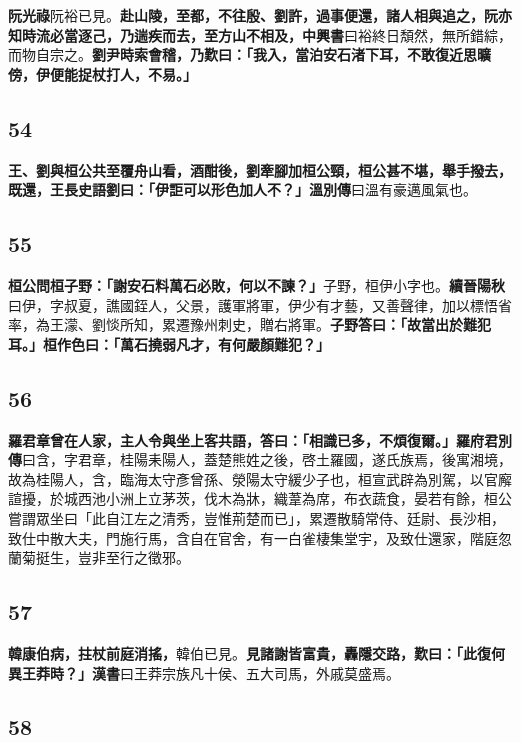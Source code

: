 \textbf{阮光祿}{\footnotesize 阮裕已見。}\textbf{赴山陵，至都，不往殷、劉許，過事便還，諸人相與追之，阮亦知時流必當逐己，乃遄疾而去，至方山不相及，}{\footnotesize \textbf{中興書}曰裕終日頽然，無所錯綜，而物自宗之。}\textbf{劉尹時索會稽，乃歎曰：「我入，當泊安石渚下耳，不敢復近思曠傍，伊便能捉杖打人，不易。」}

\subsection*{54}

\textbf{王、劉與桓公共至覆舟山看，酒酣後，劉牽腳加桓公頸，桓公甚不堪，舉手撥去，既還，王長史語劉曰：「伊詎可以形色加人不？」}{\footnotesize \textbf{溫別傳}曰溫有豪邁風氣也。}

\subsection*{55}

\textbf{桓公問桓子野：「謝安石料萬石必敗，何以不諫？」}{\footnotesize 子野，桓伊小字也。\textbf{續晉陽秋}曰伊，字叔夏，譙國銍人，父景，護軍將軍，伊少有才藝，又善聲律，加以標悟省率，為王濛、劉惔所知，累遷豫州刺史，贈右將軍。}\textbf{子野答曰：「故當出於難犯耳。」桓作色曰：「萬石撓弱凡才，有何嚴顏難犯？」}

\subsection*{56}

\textbf{羅君章曾在人家，主人令與坐上客共語，答曰：「相識已多，不煩復爾。」}{\footnotesize \textbf{羅府君別傳}曰含，字君章，桂陽耒陽人，蓋楚熊姓之後，啓土羅國，遂氏族焉，後寓湘境，故為桂陽人，含，臨海太守彥曾孫、滎陽太守緩少子也，桓宣武辟為別駕，以官廨諠擾，於城西池小洲上立茅茨，伐木為牀，織葦為席，布衣蔬食，晏若有餘，桓公嘗謂眾坐曰「此自江左之清秀，豈惟荊楚而已」，累遷散騎常侍、廷尉、長沙相，致仕中散大夫，門施行馬，含自在官舍，有一白雀棲集堂宇，及致仕還家，階庭忽蘭菊挺生，豈非至行之徵邪。}

\subsection*{57}

\textbf{韓康伯病，拄杖前庭消搖，}{\footnotesize 韓伯已見。}\textbf{見諸謝皆富貴，轟隱交路，歎曰：「此復何異王莽時？」}{\footnotesize \textbf{漢書}曰王莽宗族凡十侯、五大司馬，外戚莫盛焉。}

\subsection*{58}

